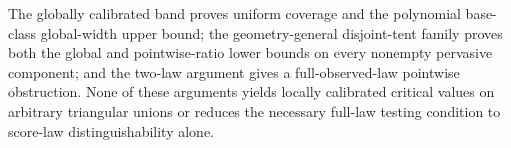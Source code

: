The globally calibrated band proves uniform coverage and the polynomial base-class global-width upper bound; the geometry-general disjoint-tent family proves both the global and pointwise-ratio lower bounds on every nonempty pervasive component; and the two-law argument gives a full-observed-law pointwise obstruction. None of these arguments yields locally calibrated critical values on arbitrary triangular unions or reduces the necessary full-law testing condition to score-law distinguishability alone.